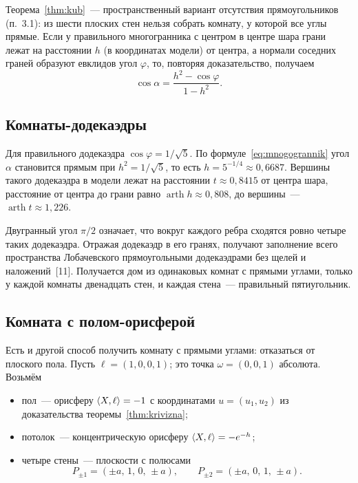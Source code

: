 Теорема~\ref{thm:kub}~--- пространственный вариант отсутствия прямоугольников (п.~3.1): из шести плоских стен нельзя собрать комнату, у которой все углы прямые. Если у правильного многогранника с центром в центре шара грани лежат на расстоянии $h$ (в координатах модели) от центра, а нормали соседних граней образуют евклидов угол $\varphi$, то, повторяя доказательство, получаем
\begin{equation}\label{eq:mnogogrannik}
\cos\alpha=\frac{h^2-\cos\varphi}{1-h^2}.
\end{equation}

\subsection{Комнаты-додекаэдры}

Для правильного додекаэдра $\cos\varphi=1/\sqrt5$. По формуле~\eqref{eq:mnogogrannik} угол $\alpha$ становится прямым при $h^2=1/\sqrt5$, то есть $h=5^{-1/4}\approx0{,}6687$. Вершины такого додекаэдра в модели лежат на расстоянии $t\approx0{,}8415$ от центра шара, расстояние от центра до грани равно $\operatorname{arth}h\approx0{,}808$, до вершины~--- $\operatorname{arth}t\approx1{,}226$.

Двугранный угол $\pi/2$ означает, что вокруг каждого ребра сходятся ровно четыре таких додекаэдра. Отражая додекаэдр в его гранях, получают заполнение всего пространства Лобачевского прямоугольными додекаэдрами без щелей и наложений~[11]. Получается дом из одинаковых комнат с прямыми углами, только у каждой комнаты двенадцать стен, и каждая стена~--- правильный пятиугольник.

\subsection{Комната с полом-орисферой}

Есть и другой способ получить комнату с прямыми углами: отказаться от плоского пола. Пусть $\ell=(1,0,0,1)$; это точка $\omega=(0,0,1)$ абсолюта. Возьмём
\begin{itemize}
  \item пол~--- орисферу $\langle X,\ell\rangle=-1$ с координатами $u=(u_1,u_2)$ из доказательства теоремы~\ref{thm:krivizna};
  \item потолок~--- концентрическую орисферу $\langle X,\ell\rangle=-e^{-h}$;
  \item четыре стены~--- плоскости с полюсами
  \[
  P_{\pm1}=(\pm a,\,1,\,0,\,\pm a),\qquad P_{\pm2}=(\pm a,\,0,\,1,\,\pm a).
  \]
\end{itemize}

